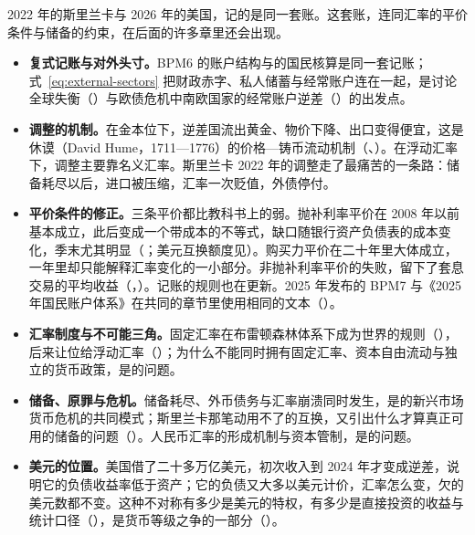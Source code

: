 2022 年的斯里兰卡与 2026 年的美国，记的是同一套账。这套账，连同汇率的平价条件与储备的约束，在后面的许多章里还会出现。
\begin{itemize}
\item \textbf{复式记账与对外头寸。}BPM6 的账户结构与的国民核算是同一套记账；式~\eqref{eq:external-sectors} 把财政赤字、私人储蓄与经常账户连在一起，是讨论全球失衡（）与欧债危机中南欧国家的经常账户逆差（）的出发点。

\item \textbf{调整的机制。}在金本位下，逆差国流出黄金、物价下降、出口变得便宜，这是休谟（David Hume，1711—1776）的价格—铸币流动机制（、）。在浮动汇率下，调整主要靠名义汇率。斯里兰卡 2022 年的调整走了最痛苦的一条路：储备耗尽以后，进口被压缩，汇率一次贬值，外债停付。

\item \textbf{平价条件的修正。}三条平价都比教科书上的弱。抛补利率平价在 2008 年以前基本成立，此后变成一个带成本的不等式，缺口随银行资产负债表的成本变化，季末尤其明显（；美元互换额度见）。购买力平价在二十年里大体成立，一年里却只能解释汇率变化的一小部分。非抛补利率平价的失败，留下了套息交易的平均收益（，）。记账的规则也在更新。2025 年发布的 BPM7 与《2025 年国民账户体系》在共同的章节里使用相同的文本（）。

\item \textbf{汇率制度与不可能三角。}固定汇率在布雷顿森林体系下成为世界的规则（），后来让位给浮动汇率（）；为什么不能同时拥有固定汇率、资本自由流动与独立的货币政策，是的问题。

\item \textbf{储备、原罪与危机。}储备耗尽、外币债务与汇率崩溃同时发生，是的新兴市场货币危机的共同模式；斯里兰卡那笔动用不了的互换，又引出什么才算真正可用的储备的问题（）。人民币汇率的形成机制与资本管制，是的问题。

\item \textbf{美元的位置。}美国借了二十多万亿美元，初次收入到 2024 年才变成逆差，说明它的负债收益率低于资产；它的负债又大多以美元计价，汇率怎么变，欠的美元数都不变\cite{gourinchas2005}。这种不对称有多少是美元的特权，有多少是直接投资的收益与统计口径（），是货币等级之争的一部分（）。
\end{itemize}

